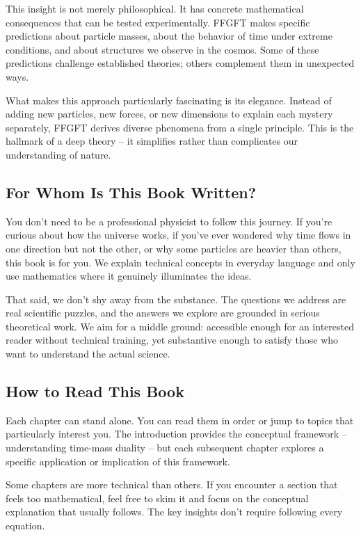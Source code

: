 \documentclass[11pt,openright,twoside]{book}
\begin{document}
This insight is not merely philosophical. It has concrete mathematical consequences that can be tested experimentally. FFGFT makes specific predictions about particle masses, about the behavior of time under extreme conditions, and about structures we observe in the cosmos. Some of these predictions challenge established theories; others complement them in unexpected ways.

What makes this approach particularly fascinating is its elegance. Instead of adding new particles, new forces, or new dimensions to explain each mystery separately, FFGFT derives diverse phenomena from a single principle. This is the hallmark of a deep theory – it simplifies rather than complicates our understanding of nature.

\subsection*{For Whom Is This Book Written?}

You don't need to be a professional physicist to follow this journey. If you're curious about how the universe works, if you've ever wondered why time flows in one direction but not the other, or why some particles are heavier than others, this book is for you. We explain technical concepts in everyday language and only use mathematics where it genuinely illuminates the ideas.

That said, we don't shy away from the substance. The questions we address are real scientific puzzles, and the answers we explore are grounded in serious theoretical work. We aim for a middle ground: accessible enough for an interested reader without technical training, yet substantive enough to satisfy those who want to understand the actual science.

\subsection*{How to Read This Book}

Each chapter can stand alone. You can read them in order or jump to topics that particularly interest you. The introduction provides the conceptual framework – understanding time-mass duality – but each subsequent chapter explores a specific application or implication of this framework.

Some chapters are more technical than others. If you encounter a section that feels too mathematical, feel free to skim it and focus on the conceptual explanation that usually follows. The key insights don't require following every equation.
\end{document}
